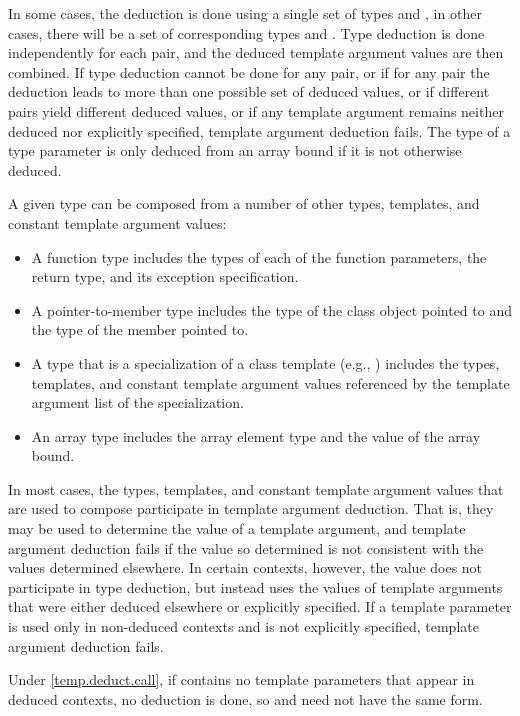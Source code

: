 \pnum
In some cases, the deduction is done using a single set of types
and
,
in other cases, there will be a set of corresponding types
and
.
Type deduction is done
independently for each
pair, and the deduced template
argument values are then combined.
If type deduction cannot be done
for any
pair, or if for any pair the deduction leads to more than
one possible set of deduced values, or if different pairs yield
different deduced values, or if any template argument remains neither
deduced nor explicitly specified, template argument deduction fails.
The type of a type parameter
is only deduced from an array bound
if it is not otherwise deduced.

\pnum
A given type
can be composed from a number of other
types, templates, and constant template argument values:

\begin{itemize}
\item
A function type includes the types of each of the function parameters,
the return type, and its exception specification.
\item
A pointer-to-member type includes the type of the class object pointed to
and the type of the member pointed to.
\item
A type that is a specialization of a class template (e.g.,
)
includes the types, templates, and constant template argument values referenced by the
template argument list of the specialization.
\item
An array type includes the array element type and the value of the
array bound.
\end{itemize}

\pnum
In most cases, the types, templates, and constant template argument values that are used
to compose
participate in template argument deduction.
That is,
they may be used to determine the value of a template argument, and
template argument deduction fails if
the value so determined is not consistent with the values determined
elsewhere.
In certain contexts, however, the value does not
participate in type deduction, but instead uses the values of template
arguments that were either deduced elsewhere or explicitly specified.
If a template parameter is used only in non-deduced contexts and is not
explicitly specified, template argument deduction fails.
\begin{note}
Under \ref{temp.deduct.call},
if  contains no template parameters that appear
in deduced contexts, no deduction is done, so  and 
need not have the same form.
\end{note}

